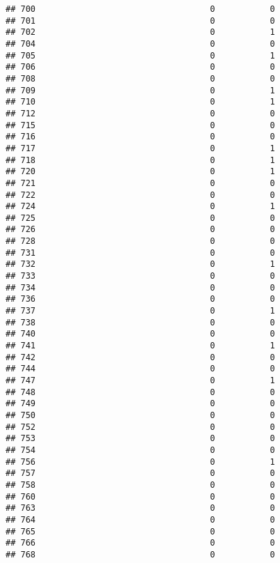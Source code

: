 \documentclass[
]{article}
\begin{document}
\begin{verbatim}
## 700                                   0           0
## 701                                   0           0
## 702                                   0           1
## 704                                   0           0
## 705                                   0           1
## 706                                   0           0
## 708                                   0           0
## 709                                   0           1
## 710                                   0           1
## 712                                   0           0
## 715                                   0           0
## 716                                   0           0
## 717                                   0           1
## 718                                   0           1
## 720                                   0           1
## 721                                   0           0
## 722                                   0           0
## 724                                   0           1
## 725                                   0           0
## 726                                   0           0
## 728                                   0           0
## 731                                   0           0
## 732                                   0           1
## 733                                   0           0
## 734                                   0           0
## 736                                   0           0
## 737                                   0           1
## 738                                   0           0
## 740                                   0           0
## 741                                   0           1
## 742                                   0           0
## 744                                   0           0
## 747                                   0           1
## 748                                   0           0
## 749                                   0           0
## 750                                   0           0
## 752                                   0           0
## 753                                   0           0
## 754                                   0           0
## 756                                   0           1
## 757                                   0           0
## 758                                   0           0
## 760                                   0           0
## 763                                   0           0
## 764                                   0           0
## 765                                   0           0
## 766                                   0           0
## 768                                   0           0

\end{verbatim}
\end{document}
